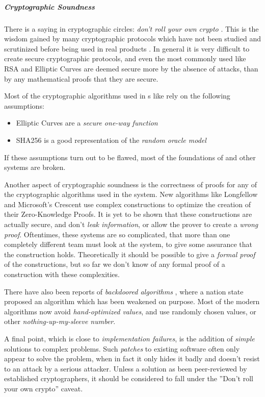 \subparagraph{Cryptographic Soundness}

There is a saying in cryptographic circles: \emph{don't roll your own crypto} \cite{SchneierLaw11}.
This is the wisdom gained by many cryptographic protocols which have not been
studied and scrutinized before being used in real products \cite{Vaudenay02}.
In general it is very difficult to create secure cryptographic protocols, and even
the most commonly used like RSA and Elliptic Curves are deemed secure more by the
absence of attacks, than by any mathematical proofs that they are secure.

Most of the cryptographic algorithms used in \eid s like \swiyu rely on the
following assumptions:
\begin{itemize}
    \item Elliptic Curves are a \emph{secure one-way function}
    \item SHA256 is a good representation of the \emph{random oracle model}
\end{itemize}
If these assumptions turn out to be flawed, most of the foundations of \eid and other systems
are broken.

Another aspect of cryptographic soundness is the correctness of proofs for any of the cryptographic
algorithms used in the system.
New algorithms like Longfellow \cite{FS24} and Microsoft's Crescent \cite{FFL25} use complex constructions to optimize the creation of their
Zero-Knowledge Proofs.
It is yet to be shown that these constructions are actually secure, and don't 
\emph{leak information}, or allow the prover to create a \emph{wrong proof}.
Oftentimes, these systems are so complicated, that more than one completely different
team must look at the system, to give some assurance that the construction holds.
Theoretically it should be possible to give a \emph{formal proof} of the constructions,
but so far we don't know of any formal proof of a construction with these
complexities.

There have also been reports of \emph{backdoored algorithms} \cite{DualEC},
where a nation state proposed an algorithm which has been weakened on purpose.
Most of the modern algorithms now avoid \emph{hand-optimized values}, and use
randomly chosen values, or other \emph{nothing-up-my-sleeve number}\cite{Salsa20}.

A final point, which is close to \emph{implementation failures}, is the addition
of \emph{simple} solutions to complex problems.
Such \emph{patches} to existing software often only appear to solve the problem,
when in fact it only hides it badly and doesn't resist to an attack by a serious
attacker.
Unless a solution as been peer-reviewed by established cryptographers, it should
be considered to fall under the ''Don't roll your own crypto'' \cite{SchneierLaw11} caveat.

